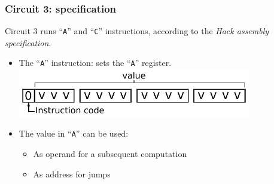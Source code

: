 \documentclass{beamer}
\begin{document}
            \begin{frame}
                \frametitle{Circuit 3: specification}

                \par{Circuit 3 runs ``\texttt{A}'' and ``\texttt{C}'' instructions,
                according to the \emph{Hack assembly specification}.}

                \begin{itemize}
                    \item The ``\texttt{A}'' instruction: sets the ``\texttt{A}'' register.
                        \includegraphics[width=0.8\textwidth]{imgs/cpu-instruction-a.pdf}
                    \vspace{0.5cm}
                    \item The value in ``\texttt{A}'' can be used:
                        \begin{itemize}
                            \item As operand for a subsequent computation
                            \item As address for jumps
                        \end{itemize}
                \end{itemize}
            \end{frame}
\end{document}
